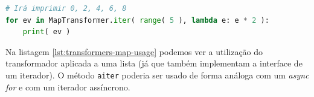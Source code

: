 \begin{lstlisting}[caption={Exemplo de um transformador \texttt{map} e da sua utilização},label={lst:transformers-map-usage},language=Python]
# Irá imprimir 0, 2, 4, 6, 8
for ev in MapTransformer.iter( range( 5 ), lambda e: e * 2 ):
    print( ev )
\end{lstlisting}

Na listagem \ref{lst:transformers-map-usage} podemos ver a utilização do transformador aplicada a uma lista (já que também implementam a interface de um iterador). O método \texttt{aiter} poderia ser usado de forma análoga com um \textit{async for} e com um iterador assíncrono.



